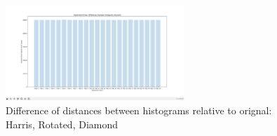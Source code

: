 \documentclass[conference]{IEEEtran}
\begin{document}
\begin{figure}[!htp]
\includegraphics[width=0.6\textwidth]{../programme/results/Task_1/rotated_experiements/Harris/diamond/experiment_three_distance_between_hists.png}
\centering
\caption{Difference of distances between histograms relative to orignal: Harris, Rotated, Diamond}
\label{Difference of distances between histograms relative to orignal: Harris, Rotated, Diamond}
\end{figure}
\end{document}
